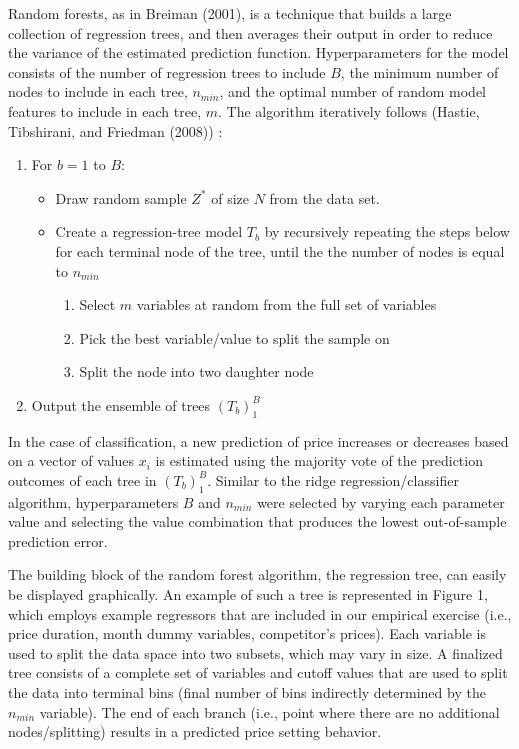 \documentclass[11pt]{article}
\begin{document}
Random forests, as in Breiman (2001), is a technique that builds a large collection of regression trees, and then averages their output in order to reduce the variance of the estimated prediction function. Hyperparameters for the model consists of the number of regression trees to include $B$, the minimum number of nodes to include in each tree, $n_{min}$, and the optimal number of random model features to include in each tree, $m$. The algorithm iteratively follows (Hastie, Tibshirani, and Friedman (2008)) : 
\begin{enumerate}
        \item For $b = 1$ to $B$:
        \begin{itemize}
            \item Draw random sample $Z^{*}$ of size $N$ from the data set.
            \item Create a regression-tree model $T_{b}$ by recursively repeating the steps below for each terminal node of the tree, until the the number of nodes is equal to $n_{min}$ 
            \begin{enumerate}
                \item Select $m$ variables at random from the full set of variables
                \item Pick the best variable/value to split the sample on
                \item Split the node into two daughter node
            \end{enumerate}
    \end{itemize}
        \item Output the ensemble of trees $(T_{b})_1^B$
    \end{enumerate}
    
In the case of classification, a new prediction of price increases or decreases based on a vector of values $x_{i}$ is estimated using the majority vote of the prediction outcomes of each tree in $(T_{b})_1^B$. Similar to the ridge regression/classifier algorithm, hyperparameters $B$ and $n_{min}$ were selected by varying each parameter value and selecting the value combination that produces the lowest out-of-sample prediction error.

The building block of the random forest algorithm, the regression tree, can easily be displayed graphically. An example of such a tree is represented in Figure 1, which employs example regressors that are included in our empirical exercise (i.e., price duration, month dummy variables, competitor's prices). Each variable is used to split the data space into two subsets, which may vary in size. A finalized tree consists of a complete set of variables and cutoff values that are used to split the data into terminal bins (final number of bins indirectly determined by the $n_{min}$ variable). The end of each branch (i.e., point where there are no additional nodes/splitting) results in a predicted price setting behavior.   
\end{document}
